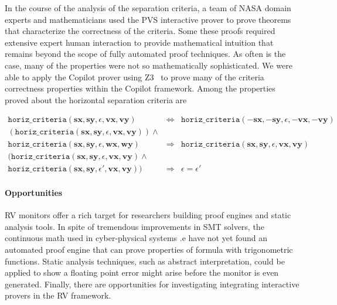 In the course of the analysis of the separation criteria, a team of
NASA domain experts and mathematicians used the PVS interactive prover
to prove theorems that characterize the correctness of the
criteria. Some these proofs required extensive expert human
interaction to provide mathematical intuition that remains beyond the
scope of fully automated proof techniques. As often is the case, many
of the properties were not so mathematically sophisticated.  We were
able to apply the Copilot prover  using Z3~\cite{XXX}  to prove
many of the criteria correctness properties within the Copilot
framework. Among the properties proved about the horizontal separation
criteria are

\begin{eqnarray*}
\texttt{horiz\_criteria}(\bm{sx},  \bm{sy},
\epsilon,  \bm{vx},  \bm{vy}) & \Longleftrightarrow &
\texttt{horiz\_criteria}(\bm{-sx},  \bm{-sy},
\epsilon, \bm{-vx},  \bm{-vy})   \\
( \texttt{horiz\_criteria}(\bm{sx},\bm{sy},
\epsilon, \bm{vx},\bm{vy}) ) \wedge &&  \\ 
\texttt{horiz\_criteria} (\bm{sx},  \bm{sy},
\epsilon,  \bm{wx}, \bm{wy})& \Longrightarrow&
\texttt{horiz\_criteria} (\bm{sx}, \bm{sy},
\epsilon,\bm{vx},\bm{vy})\\
( \texttt{horiz\_criteria}(\bm{sx},  \bm{sy},
\epsilon,  \bm{vx},  \bm{vy})  \wedge  &&\\
\texttt{horiz\_criteria}(\bm{sx},  \bm{sy},
\epsilon',  \bm{vx},  \bm{vy}) )  &\Longrightarrow & \epsilon = \epsilon'
\end{eqnarray*}

\paragraph{Opportunities} RV monitors offer a rich target for
researchers building proof engines and static analysis tools.  In
spite of tremendous improvements in SMT solvers, the continuous math
used in cyber-physical systems .e have not yet found an automated
proof engine that can prove properties of formula with trigonometric
functions. Static analysis techniques, such as abstract interpretation,
could be applied to show a floating point error might arise before the
monitor is even generated. Finally, there are opportunities for
investigating integrating interactive provers in the RV framework. 

%
%




